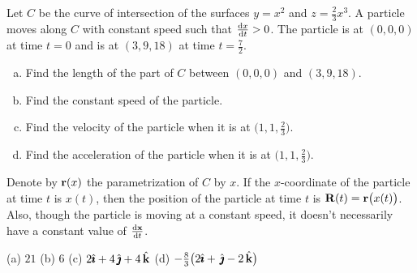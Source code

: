 \begin{question}[M317 1999A] %
 Let $C$ be the curve of intersection of
the surfaces $y=x^2$ and $z=\frac{2}{3}x^3$.
A particle moves along $C$ with constant speed such that $\diff{x}{t}>0$.
The particle is at $(0,0,0)$ at time $t=0$ and is at $(3,9,18)$ at time
$t=\frac{7}{2}$.
\begin{enumerate}[(a)]
\item
Find the length of the part of $C$ between $(0,0,0)$ and $(3,9,18)$.
\item
Find the constant speed of the particle.
\item
Find the velocity of the particle when it is at $\big(1,1,\frac{2}{3}\big)$.
\item
Find the acceleration of the particle when it is at $\big(1,1,\frac{2}{3}\big)$.
\end{enumerate}
\end{question}

\begin{hint} 
Denote by $\mathbf{r}(x)$ the parametrization of $C$ by $x$. If the $x$-coordinate
of the particle at time $t$ is $x(t)$, then the position of the particle at time $t$ is $\mathbf{R}(t)=\mathbf{r}\big(x(t)\big)$. Also, though the particle is moving at a constant speed, it doesn't necessarily have a constant value of $\diff{\vx}{t}$.
\end{hint}

\begin{answer} 
(a) $21$\qquad
(b) $6$\qquad
(c) $2\hat{\pmb{\imath}}+4\,\hat{\pmb{\jmath}}+4\,\hat{\mathbf{k}}$\qquad
(d) $-\frac{8}{3}\big(2\hat{\pmb{\imath}}+\,\hat{\pmb{\jmath}}-2\,\hat{\mathbf{k}}\big)$
\end{answer}

